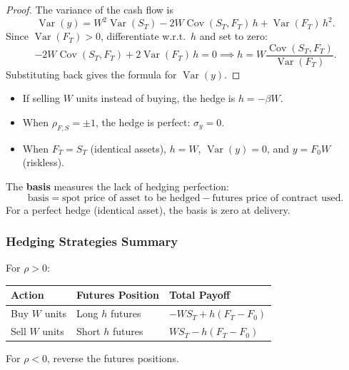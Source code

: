 \begin{proof}
  The variance of the cash flow is
  \[
    \operatorname{Var}(y) = W^2\operatorname{Var}(S_T) - 2W\operatorname{Cov}(S_T,F_T)\,h + \operatorname{Var}(F_T)\,h^2.
  \]
  Since $\operatorname{Var}(F_T) > 0$, differentiate w.r.t.\ $h$ and set to zero:
  \[
    -2W\operatorname{Cov}(S_T,F_T) + 2\operatorname{Var}(F_T)\,h = 0 \implies h = W\frac{\operatorname{Cov}(S_T,F_T)}{\operatorname{Var}(F_T)}.
  \]
  Substituting back gives the formula for $\operatorname{Var}(y)$.
\end{proof}

\begin{remark}
  \begin{itemize}
    \item If selling $W$ units instead of buying, the hedge is $h = -\beta W$.
    \item When $\rho_{F,S} = \pm 1$, the hedge is perfect: $\sigma_y = 0$.
    \item When $F_T = S_T$ (identical assets), $h = W$, $\operatorname{Var}(y) = 0$, and $y = F_0 W$ (riskless).
  \end{itemize}
\end{remark}

\begin{definition}[Basis]
  The \textbf{basis} measures the lack of hedging perfection:
  \[
    \text{basis} = \text{spot price of asset to be hedged} - \text{futures price of contract used}.
  \]
  For a perfect hedge (identical asset), the basis is zero at delivery.
\end{definition}

\subsubsection*{Hedging Strategies Summary}

For $\rho > 0$:
\begin{center}
\begin{tabular}{lll}
  \hline
  Action & Futures Position & Total Payoff \\
  \hline
  Buy $W$ units & Long $h$ futures & $-WS_T + h(F_T - F_0)$ \\
  Sell $W$ units & Short $h$ futures & $WS_T - h(F_T - F_0)$ \\
  \hline
\end{tabular}
\end{center}

For $\rho < 0$, reverse the futures positions.
